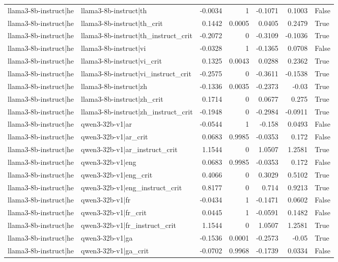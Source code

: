 \begin{table}
\begin{tabular}{l l r r r r l}
llama3-8b-instruct|he & llama3-8b-instruct|th & -0.0034 & 1 & -0.1071 & 0.1003 & False \\
llama3-8b-instruct|he & llama3-8b-instruct|th_crit & 0.1442 & 0.0005 & 0.0405 & 0.2479 & True \\
llama3-8b-instruct|he & llama3-8b-instruct|th_instruct_crit & -0.2072 & 0 & -0.3109 & -0.1036 & True \\
llama3-8b-instruct|he & llama3-8b-instruct|vi & -0.0328 & 1 & -0.1365 & 0.0708 & False \\
llama3-8b-instruct|he & llama3-8b-instruct|vi_crit & 0.1325 & 0.0043 & 0.0288 & 0.2362 & True \\
llama3-8b-instruct|he & llama3-8b-instruct|vi_instruct_crit & -0.2575 & 0 & -0.3611 & -0.1538 & True \\
llama3-8b-instruct|he & llama3-8b-instruct|zh & -0.1336 & 0.0035 & -0.2373 & -0.03 & True \\
llama3-8b-instruct|he & llama3-8b-instruct|zh_crit & 0.1714 & 0 & 0.0677 & 0.275 & True \\
llama3-8b-instruct|he & llama3-8b-instruct|zh_instruct_crit & -0.1948 & 0 & -0.2984 & -0.0911 & True \\
llama3-8b-instruct|he & qwen3-32b-v1|ar & -0.0544 & 1 & -0.158 & 0.0493 & False \\
llama3-8b-instruct|he & qwen3-32b-v1|ar_crit & 0.0683 & 0.9985 & -0.0353 & 0.172 & False \\
llama3-8b-instruct|he & qwen3-32b-v1|ar_instruct_crit & 1.1544 & 0 & 1.0507 & 1.2581 & True \\
llama3-8b-instruct|he & qwen3-32b-v1|eng & 0.0683 & 0.9985 & -0.0353 & 0.172 & False \\
llama3-8b-instruct|he & qwen3-32b-v1|eng_crit & 0.4066 & 0 & 0.3029 & 0.5102 & True \\
llama3-8b-instruct|he & qwen3-32b-v1|eng_instruct_crit & 0.8177 & 0 & 0.714 & 0.9213 & True \\
llama3-8b-instruct|he & qwen3-32b-v1|fr & -0.0434 & 1 & -0.1471 & 0.0602 & False \\
llama3-8b-instruct|he & qwen3-32b-v1|fr_crit & 0.0445 & 1 & -0.0591 & 0.1482 & False \\
llama3-8b-instruct|he & qwen3-32b-v1|fr_instruct_crit & 1.1544 & 0 & 1.0507 & 1.2581 & True \\
llama3-8b-instruct|he & qwen3-32b-v1|ga & -0.1536 & 0.0001 & -0.2573 & -0.05 & True \\
llama3-8b-instruct|he & qwen3-32b-v1|ga_crit & -0.0702 & 0.9968 & -0.1739 & 0.0334 & False \\

\end{tabular}
\end{table}
